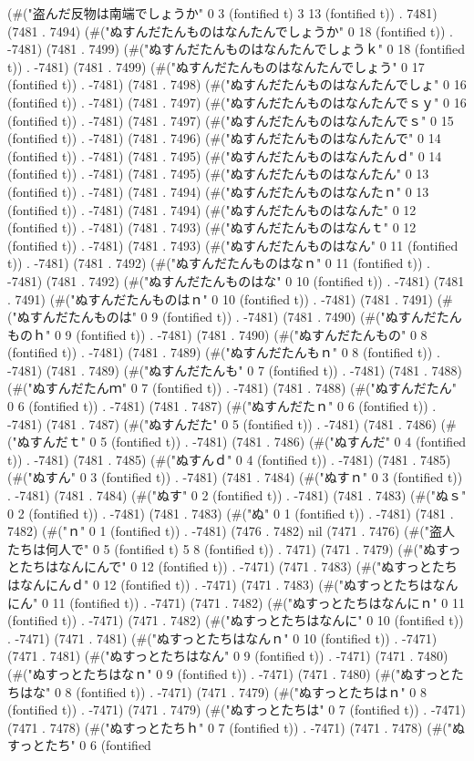 (#("盗んだ反物は南端でしょうか" 0 3 (fontified t) 3 13 (fontified t)) . 7481) (7481 . 7494) (#("ぬすんだたんものはなんたんでしょうか" 0 18 (fontified t)) . -7481) (7481 . 7499) (#("ぬすんだたんものはなんたんでしょうｋ" 0 18 (fontified t)) . -7481) (7481 . 7499) (#("ぬすんだたんものはなんたんでしょう" 0 17 (fontified t)) . -7481) (7481 . 7498) (#("ぬすんだたんものはなんたんでしょ" 0 16 (fontified t)) . -7481) (7481 . 7497) (#("ぬすんだたんものはなんたんでｓｙ" 0 16 (fontified t)) . -7481) (7481 . 7497) (#("ぬすんだたんものはなんたんでｓ" 0 15 (fontified t)) . -7481) (7481 . 7496) (#("ぬすんだたんものはなんたんで" 0 14 (fontified t)) . -7481) (7481 . 7495) (#("ぬすんだたんものはなんたんｄ" 0 14 (fontified t)) . -7481) (7481 . 7495) (#("ぬすんだたんものはなんたん" 0 13 (fontified t)) . -7481) (7481 . 7494) (#("ぬすんだたんものはなんたｎ" 0 13 (fontified t)) . -7481) (7481 . 7494) (#("ぬすんだたんものはなんた" 0 12 (fontified t)) . -7481) (7481 . 7493) (#("ぬすんだたんものはなんｔ" 0 12 (fontified t)) . -7481) (7481 . 7493) (#("ぬすんだたんものはなん" 0 11 (fontified t)) . -7481) (7481 . 7492) (#("ぬすんだたんものはなｎ" 0 11 (fontified t)) . -7481) (7481 . 7492) (#("ぬすんだたんものはな" 0 10 (fontified t)) . -7481) (7481 . 7491) (#("ぬすんだたんものはｎ" 0 10 (fontified t)) . -7481) (7481 . 7491) (#("ぬすんだたんものは" 0 9 (fontified t)) . -7481) (7481 . 7490) (#("ぬすんだたんものｈ" 0 9 (fontified t)) . -7481) (7481 . 7490) (#("ぬすんだたんもの" 0 8 (fontified t)) . -7481) (7481 . 7489) (#("ぬすんだたんもｎ" 0 8 (fontified t)) . -7481) (7481 . 7489) (#("ぬすんだたんも" 0 7 (fontified t)) . -7481) (7481 . 7488) (#("ぬすんだたんｍ" 0 7 (fontified t)) . -7481) (7481 . 7488) (#("ぬすんだたん" 0 6 (fontified t)) . -7481) (7481 . 7487) (#("ぬすんだたｎ" 0 6 (fontified t)) . -7481) (7481 . 7487) (#("ぬすんだた" 0 5 (fontified t)) . -7481) (7481 . 7486) (#("ぬすんだｔ" 0 5 (fontified t)) . -7481) (7481 . 7486) (#("ぬすんだ" 0 4 (fontified t)) . -7481) (7481 . 7485) (#("ぬすんｄ" 0 4 (fontified t)) . -7481) (7481 . 7485) (#("ぬすん" 0 3 (fontified t)) . -7481) (7481 . 7484) (#("ぬすｎ" 0 3 (fontified t)) . -7481) (7481 . 7484) (#("ぬす" 0 2 (fontified t)) . -7481) (7481 . 7483) (#("ぬｓ" 0 2 (fontified t)) . -7481) (7481 . 7483) (#("ぬ" 0 1 (fontified t)) . -7481) (7481 . 7482) (#("ｎ" 0 1 (fontified t)) . -7481) (7476 . 7482) nil (7471 . 7476) (#("盗人たちは何人で" 0 5 (fontified t) 5 8 (fontified t)) . 7471) (7471 . 7479) (#("ぬすっとたちはなんにんで" 0 12 (fontified t)) . -7471) (7471 . 7483) (#("ぬすっとたちはなんにんｄ" 0 12 (fontified t)) . -7471) (7471 . 7483) (#("ぬすっとたちはなんにん" 0 11 (fontified t)) . -7471) (7471 . 7482) (#("ぬすっとたちはなんにｎ" 0 11 (fontified t)) . -7471) (7471 . 7482) (#("ぬすっとたちはなんに" 0 10 (fontified t)) . -7471) (7471 . 7481) (#("ぬすっとたちはなんｎ" 0 10 (fontified t)) . -7471) (7471 . 7481) (#("ぬすっとたちはなん" 0 9 (fontified t)) . -7471) (7471 . 7480) (#("ぬすっとたちはなｎ" 0 9 (fontified t)) . -7471) (7471 . 7480) (#("ぬすっとたちはな" 0 8 (fontified t)) . -7471) (7471 . 7479) (#("ぬすっとたちはｎ" 0 8 (fontified t)) . -7471) (7471 . 7479) (#("ぬすっとたちは" 0 7 (fontified t)) . -7471) (7471 . 7478) (#("ぬすっとたちｈ" 0 7 (fontified t)) . -7471) (7471 . 7478) (#("ぬすっとたち" 0 6 (fontified 